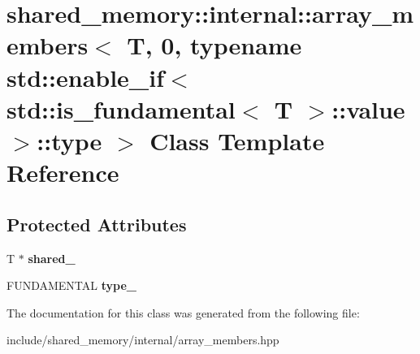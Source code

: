\hypertarget{classshared__memory_1_1internal_1_1array__members_3_01T_00_010_00_01typename_01std_1_1enable__ifb2fde5f96702510d664610c5e9570772}{}\section{shared\+\_\+memory\+:\+:internal\+:\+:array\+\_\+members$<$ T, 0, typename std\+:\+:enable\+\_\+if$<$ std\+:\+:is\+\_\+fundamental$<$ T $>$\+:\+:value $>$\+:\+:type $>$ Class Template Reference}
\label{classshared__memory_1_1internal_1_1array__members_3_01T_00_010_00_01typename_01std_1_1enable__ifb2fde5f96702510d664610c5e9570772}
\subsection*{Protected Attributes}
\begin{DoxyCompactItemize}
\item 
T $\ast$ {\bfseries shared\+\_\+}\hypertarget{classshared__memory_1_1internal_1_1array__members_3_01T_00_010_00_01typename_01std_1_1enable__ifb2fde5f96702510d664610c5e9570772_af2e2d48d60bf0b97ad542183007fc4e9}{}\label{classshared__memory_1_1internal_1_1array__members_3_01T_00_010_00_01typename_01std_1_1enable__ifb2fde5f96702510d664610c5e9570772_af2e2d48d60bf0b97ad542183007fc4e9}

\item 
F\+U\+N\+D\+A\+M\+E\+N\+T\+AL {\bfseries type\+\_\+}\hypertarget{classshared__memory_1_1internal_1_1array__members_3_01T_00_010_00_01typename_01std_1_1enable__ifb2fde5f96702510d664610c5e9570772_a2c26512ea8a02432f5f157e8c4ef7fa9}{}\label{classshared__memory_1_1internal_1_1array__members_3_01T_00_010_00_01typename_01std_1_1enable__ifb2fde5f96702510d664610c5e9570772_a2c26512ea8a02432f5f157e8c4ef7fa9}

\end{DoxyCompactItemize}


The documentation for this class was generated from the following file\+:\begin{DoxyCompactItemize}
\item 
include/shared\+\_\+memory/internal/array\+\_\+members.\+hpp\end{DoxyCompactItemize}
